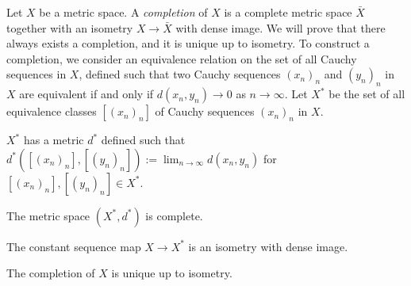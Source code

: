 \documentclass{../../large}
\begin{document}
\begin{prb}
Let $X$ be a metric space.
A \emph{completion} of $X$ is a complete metric space $\bar X$ together with an isometry $X\to\bar X$ with dense image.
We will prove that there always exists a completion, and it is unique up to isometry.
To construct a completion, we consider an equivalence relation on the set of all Cauchy sequences in $X$, defined such that two Cauchy sequences $(x_n)_n$ and $(y_n)_n$ in $X$ are equivalent if and only if $d(x_n,y_n)\to0$ as $n\to\infty$.
Let $X^*$ be the set of all equivalence classes $[(x_n)_n]$ of Cauchy sequences $(x_n)_n$ in $X$.
\begin{parts}
\item $X^*$ has a metric $d^*$ defined such that $d^*([(x_n)_n],[(y_n)_n]):=\lim_{n\to\infty}d(x_n,y_n)$ for $[(x_n)_n],[(y_n)_n]\in X^*$.
\item The metric space $(X^*,d^*)$ is complete.
\item The constant sequence map $X\to X^*$ is an isometry with dense image.
\item The completion of $X$ is unique up to isometry.
\end{parts}
\end{prb}
\end{document}
